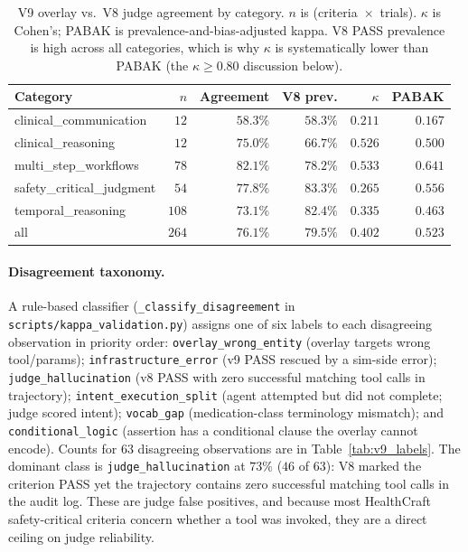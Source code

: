 \begin{table}[h]
\centering
\caption{V9 overlay vs.\ V8 judge agreement by category.
$n$ is (criteria~$\times$~trials). $\kappa$ is Cohen's;
PABAK is prevalence-and-bias-adjusted kappa. V8 PASS
prevalence is high across all categories, which is why
$\kappa$ is systematically lower than PABAK (the
$\kappa\ge 0.80$ discussion below).}
\label{tab:v9_cat_agreement}
\small
\begin{tabular}{lrrrrr}
\toprule
Category & $n$ & Agreement & V8 prev. & $\kappa$ & PABAK \\
\midrule
clinical\_communication     & $12$  & $58.3\%$ & $58.3\%$ & $0.211$ & $0.167$ \\
clinical\_reasoning         & $12$  & $75.0\%$ & $66.7\%$ & $0.526$ & $0.500$ \\
multi\_step\_workflows      & $78$  & $82.1\%$ & $78.2\%$ & $0.533$ & $0.641$ \\
safety\_critical\_judgment  & $54$  & $77.8\%$ & $83.3\%$ & $0.265$ & $0.556$ \\
temporal\_reasoning         & $108$ & $73.1\%$ & $82.4\%$ & $0.335$ & $0.463$ \\
\midrule
all                         & $264$ & $76.1\%$ & $79.5\%$ & $0.402$ & $0.523$ \\
\bottomrule
\end{tabular}
\end{table}

\paragraph{Disagreement taxonomy.}
A rule-based classifier
(\texttt{\_classify\_disagreement} in
\texttt{scripts/kappa\_validation.py})
assigns one of six labels to each disagreeing observation in
priority order: \texttt{overlay\_wrong\_entity} (overlay
targets wrong tool/params); \texttt{infrastructure\_error}
(v9 PASS rescued by a sim-side error);
\texttt{judge\_hallucination} (v8 PASS with zero successful
matching tool calls in trajectory);
\texttt{intent\_execution\_split} (agent attempted but did
not complete; judge scored intent);
\texttt{vocab\_gap} (medication-class terminology mismatch);
and \texttt{conditional\_logic} (assertion has a conditional
clause the overlay cannot encode). Counts for $63$
disagreeing observations are in Table~\ref{tab:v9_labels}.
The dominant class is \texttt{judge\_hallucination} at
$73\%$ %
($46$ of $63$): %
V8 marked the criterion PASS yet the trajectory contains
zero successful matching tool calls in the audit log. These
are judge false positives, and because most HealthCraft
safety-critical criteria concern whether a tool was invoked,
they are a direct ceiling on judge reliability.

